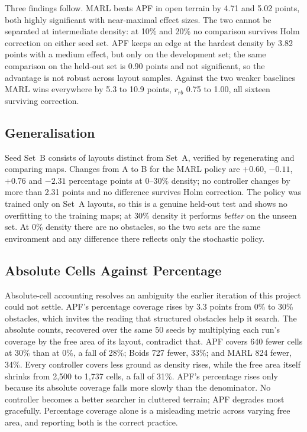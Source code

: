 \documentclass[a4paper, 10pt, conference]{ieeeconf}
\begin{document}
Three findings follow. MARL beats APF in open terrain by 4.71 and
5.02 points, both highly significant with near-maximal effect sizes.
The two cannot be separated at intermediate density: at 10\% and 20\%
no comparison survives Holm correction on either seed set. APF keeps
an edge at the hardest density by 3.82 points with a medium effect,
but only on the development set; the same comparison on the held-out
set is 0.90 points and not significant, so the advantage is not robust
across layout samples. Against the two weaker baselines MARL wins
everywhere by 5.3 to 10.9 points, $r_{rb}$ 0.75 to 1.00, all sixteen
surviving correction.

\subsection{Generalisation}\label{sec:generalisation}

Seed Set~B consists of layouts distinct from Set~A, verified by
regenerating and comparing maps. Changes from A to B for the MARL
policy are $+0.60$, $-0.11$, $+0.76$ and $-2.31$ percentage points at
0--30\% density; no controller changes by more than 2.31 points and no
difference survives Holm correction. The policy was trained only on
Set~A layouts, so this is a genuine held-out test and shows no
overfitting to the training maps; at 30\% density it performs
\emph{better} on the unseen set. At 0\% density there are no obstacles,
so the two sets are the same environment and any difference there
reflects only the stochastic policy.

\subsection{Absolute Cells Against Percentage}\label{sec:absolute}


Absolute-cell accounting resolves an ambiguity the earlier iteration
of this project could not settle. APF's percentage coverage rises by 3.3 points from 0\% to
30\% obstacles, which invites the reading that structured obstacles
help it search. The absolute counts, recovered over the same 50 seeds
by multiplying each run's coverage by the free area of its layout,
contradict that. APF covers 640 fewer cells at 30\% than at 0\%, a
fall of 28\%; Boids 727 fewer, 33\%; and MARL 824 fewer, 34\%. Every
controller covers less ground as density rises, while the free area
itself shrinks from 2{,}500 to 1{,}737 cells, a fall of 31\%. APF's
percentage rises only because its absolute coverage falls more slowly
than the denominator. No controller becomes
a better searcher in cluttered terrain; APF degrades most gracefully.
Percentage coverage alone is a misleading metric across varying free
area, and reporting both is the correct practice.
\end{document}
